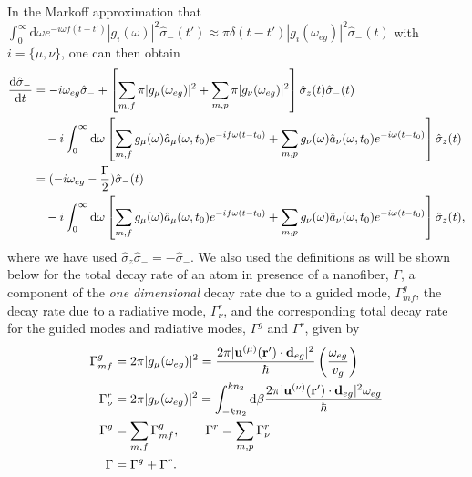 \documentclass[preprint,aps,pra,onecolumn]{revtex4-1} %
\begin{document}
In the Markoff approximation that $\int_0^\infty \mathrm{d}\omega e^{-i\omega f(t-t')} |g_i(\omega)|^2\hat{\sigma}_-(t')\approx \pi \delta(t-t')|g_i(\omega_{eg})|^2\hat{\sigma}_-(t)$ with $ i=\{\mu,\nu \} $, one can then obtain
\begin{align}
\frac{{\mathrm d} {\hat{\sigma}_-}}{{\mathrm d}t} &= -i\omega_{eg} \hat{\sigma}_- + \left[ \sum_{m,f} \pi |g_\mu(\omega_{eg})|^2 +\sum_{m,p} \pi |g_\nu(\omega_{eg})|^2\right] \hat{\sigma}_z(t)\hat{\sigma}_-(t) \nonumber\\
&\quad - i\int_0^\infty \mathrm{d}\omega \left[ \sum_{m,f} g_\mu(\omega) \hat{a}_\mu(\omega,t_0) e^{-if\omega (t-t_0)}+\sum_{m,p} g_\nu(\omega) \hat{a}_\nu(\omega,t_0) e^{-i\omega (t-t_0)} \right]\hat{\sigma}_z(t)\\
&= (-i\omega_{eg}-\frac{\Gamma}{2})\hat{\sigma}_-(t) \nonumber \\
&\quad -i\int_0^\infty \mathrm{d}\omega \left[ \sum_{m,f} g_\mu(\omega) \hat{a}_\mu(\omega,t_0)e^{-if\omega (t-t_0)}+ \sum_{m,p} g_\nu(\omega) \hat{a}_\nu(\omega,t_0)e^{-i\omega (t-t_0)} \right] \hat{\sigma}_z(t) , \label{eq:dsigma-t}
\end{align}
where we have used $\hat{\sigma}_z\hat{\sigma}_-=-\hat{\sigma}_- $. We also used  the definitions as will 
be shown below for the total decay rate of an atom in presence of a nanofiber, $\Gamma$, a component 
of the \textit{one dimensional} decay rate due to a guided mode, $\Gamma^g_{mf} $, the decay rate due 
to a radiative mode, $\Gamma^r_{\nu} $, and the corresponding total decay rate for the guided modes 
and radiative modes, $ \Gamma^g $ and $ \Gamma^r $, given by
\begin{align}
\Gamma^g_{mf} &= 2\pi |g_\mu(\omega_{eg})|^2= \frac{2\pi|\mathbf{u}^{(\mu)}(\mathbf{r}')\cdot 
\mathbf{d}_{eg}|^2}{\hbar }\left( \frac{\omega_{eg}}{v_g}\right) \\
\Gamma^r_{\nu} &= 2\pi |g_\nu(\omega_{eg})|^2=\int_{-kn_2}^{kn_2}\mathrm{d}\beta \frac{2\pi|\mathbf{u}^{(\nu)}(\mathbf{r}')\cdot \mathbf{d}_{eg}|^2\omega_{eg}}{\hbar } \\
\Gamma^g &= \sum_{m,f}\Gamma^g_{mf},\quad\quad \Gamma^r = \sum_{m,p}\Gamma^r_{\nu}\\
\Gamma &= \Gamma^g+\Gamma^r. 
\end{align}
\end{document}
